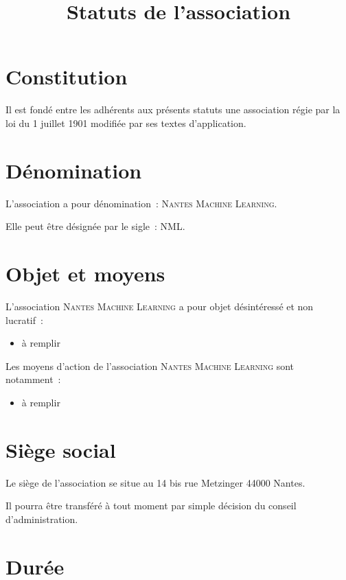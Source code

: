 \documentclass{article}
\title{Statuts de l'association \Nom}
\date{}
\newcommand{\Nom}{\textsc{Nantes Machine Learning}} %
\newcommand{\Sigle}{NML} %
\begin{document}
\maketitle

\section{Constitution}
\label{sec:constitution}

Il est fondé entre les adhérents aux présents statuts une association
régie par la loi du 1\ier{} juillet 1901 modifiée par ses textes
d'application.

\section{Dénomination}
\label{sec:denomination}
L'association a pour dénomination~: \og\Nom\fg.

Elle peut être désignée par le sigle~: \og\Sigle\fg.

\section{Objet et moyens}
\label{sec:objet-et-moyens}

L'association \Nom{} a pour objet désintéressé et non lucratif~:

\begin{itemize}
\item à remplir
\end{itemize}

Les moyens d'action de l'association \Nom{} sont notamment~:

\begin{itemize}
\item à remplir
\end{itemize}

\section{Siège social}
\label{sec:siege-social}

Le siège de l'association se situe au 14 bis rue Metzinger 44000 Nantes.

Il pourra être transféré à tout moment par simple décision du conseil
d'administration.

\section{Durée}
\label{sec:duree}
\end{document}
